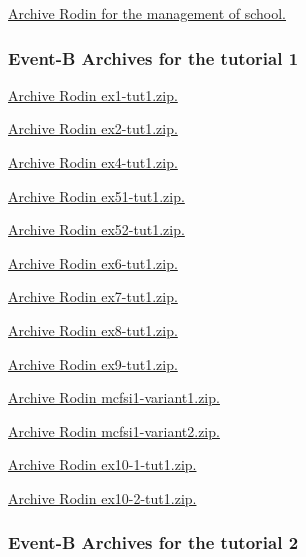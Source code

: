 \documentclass[ 12pt]{article}
\begin{document}
 
 \href{http://mery54.github.io/teaching/mosos/lecturesnotes/
   ex-school.zip}{Archive Rodin  for   the management of school. }
  


 \subsubsection{Event-B Archives for   the tutorial 1}
\label{sec:event-b-archives}



\href{http://mery54.github.io/teaching/mosos/models/ex1-tut1.zip}{Archive
  Rodin   ex1-tut1.zip.}

\href{http://mery54.github.io/teaching/mosos/models/ex2-tut1.zip}{Archive 
  Rodin   ex2-tut1.zip.}

\href{http://mery54.github.io/teaching/mosos/models/ex4-tut1.zip}{Archive 
  Rodin   ex4-tut1.zip.}


\href{http://mery54.github.io/teaching/mosos/models/ex51-tut1.zip}{Archive 
  Rodin   ex51-tut1.zip.}

\href{http://mery54.github.io/teaching/mosos/models/ex52-tut1.zip}{Archive 
  Rodin   ex52-tut1.zip.}



\href{http://mery54.github.io/teaching/mosos/models/ex6-tut1.zip}{Archive 
  Rodin   ex6-tut1.zip.}



\href{http://mery54.github.io/teaching/mosos/models/ex7-tut1.zip}{Archive 
  Rodin   ex7-tut1.zip.}


\href{http://mery54.github.io/teaching/mosos/models/ex8-tut1.zip}{Archive 
  Rodin   ex8-tut1.zip.}


\href{http://mery54.github.io/teaching/mosos/models/ex9-tut1.zip}{Archive 
  Rodin   ex9-tut1.zip.}



\href{http://mery54.github.io/teaching/mosos/models/mcfsi1-variant1.zip}{Archive 
  Rodin   mcfsi1-variant1.zip.}

\href{http://mery54.github.io/teaching/mosos/models/mcfsi1-variant2.zip}{Archive 
  Rodin   mcfsi1-variant2.zip.}


\href{http://mery54.github.io/teaching/mosos/models/ex10-1-tut1.zip}{Archive 
  Rodin   ex10-1-tut1.zip.}

\href{http://mery54.github.io/teaching/mosos/models/ex10-2-tut1.zip}{Archive 
  Rodin   ex10-2-tut1.zip.}



 \subsubsection{Event-B Archives for   the tutorial 2}
\label{sec:event-b-archives}
\end{document}

